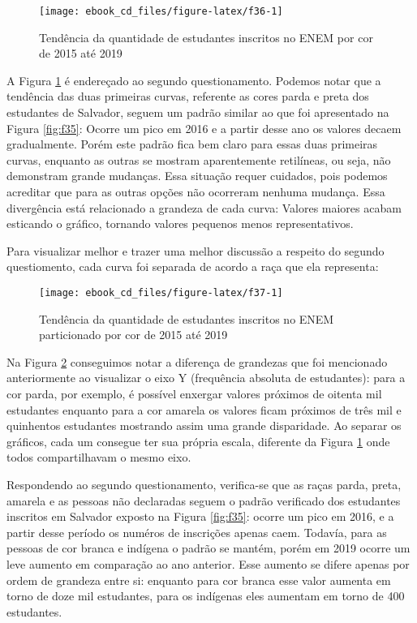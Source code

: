 \documentclass[
  oneside]{book}
\begin{document}
\begin{figure}

{\centering \texttt{[image: ebook\_cd\_files/figure-latex/f36-1]} 

}

\caption{Tendência da quantidade de estudantes inscritos no ENEM por cor de 2015 até 2019}\label{fig:f36}
\end{figure}

A Figura \ref{fig:f36} é endereçado ao segundo questionamento. Podemos notar que a tendência das duas primeiras curvas, referente as cores parda e preta dos estudantes de Salvador, seguem um padrão similar ao que foi apresentado na Figura \ref{fig:f35}: Ocorre um pico em 2016 e a partir desse ano os valores decaem gradualmente. Porém este padrão fica bem claro para essas duas primeiras curvas, enquanto as outras se mostram aparentemente retilíneas, ou seja, não demonstram grande mudanças. Essa situação requer cuidados, pois podemos acreditar que para as outras opções não ocorreram nenhuma mudança. Essa divergência está relacionado a grandeza de cada curva: Valores maiores acabam esticando o gráfico, tornando valores pequenos menos representativos.

Para visualizar melhor e trazer uma melhor discussão a respeito do segundo questiomento, cada curva foi separada de acordo a raça que ela representa:

\begin{figure}

{\centering \texttt{[image: ebook\_cd\_files/figure-latex/f37-1]} 

}

\caption{Tendência da quantidade de estudantes inscritos no ENEM particionado por cor de 2015 até 2019}\label{fig:f37}
\end{figure}

Na Figura \ref{fig:f37} conseguimos notar a diferença de grandezas que foi mencionado anteriormente ao visualizar o eixo Y (frequência absoluta de estudantes): para a cor parda, por exemplo, é possível enxergar valores próximos de oitenta mil estudantes enquanto para a cor amarela os valores ficam próximos de três mil e quinhentos estudantes mostrando assim uma grande disparidade. Ao separar os gráficos, cada um consegue ter sua própria escala, diferente da Figura \ref{fig:f36} onde todos compartilhavam o mesmo eixo.

Respondendo ao segundo questionamento, verifica-se que as raças parda, preta, amarela e as pessoas não declaradas seguem o padrão verificado dos estudantes inscritos em Salvador exposto na Figura \ref{fig:f35}: ocorre um pico em 2016, e a partir desse período os numéros de inscrições apenas caem. Todavía, para as pessoas de cor branca e indígena o padrão se mantém, porém em 2019 ocorre um leve aumento em comparação ao ano anterior. Esse aumento se difere apenas por ordem de grandeza entre si: enquanto para cor branca esse valor aumenta em torno de doze mil estudantes, para os indígenas eles aumentam em torno de 400 estudantes.
\end{document}

